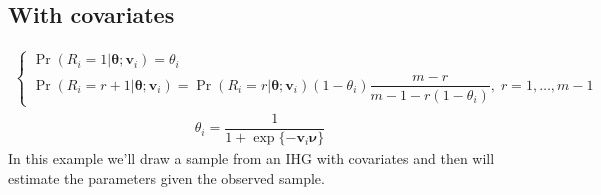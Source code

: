 \documentclass[letterpaper,10pt,english]{sphinxmanual}
\begin{document}
\subsection{With covariates}
\label{\detokenize{manual:ihg-with-covariates}}\label{\detokenize{manual:id237}}
\sphinxAtStartPar
{}
\begin{equation*}
\begin{split}\left\{
\begin{array}{l}
    \Pr(R_i=1|\pmb\theta;\pmb v_i) = \theta_i
    \\
    \Pr(R_i=r+1|\pmb\theta;\pmb v_i) = \Pr(R_i=r|\pmb\theta;\pmb v_i)(1-\theta_i)\dfrac{m-r}{m-1-r(1-\theta_i)},\; r= 1, \ldots, m-1
\end{array}
\right.\end{split}
\end{equation*}\begin{equation*}
\begin{split}\theta_i = \dfrac{1}{1 + \exp\{ - \pmb v_i \pmb \nu \}}\end{split}
\end{equation*}
\sphinxAtStartPar
In this example we’ll draw a sample from an IHG with covariates
and then will estimate the parameters given the observed sample.
\def\sphinxLiteralBlockLabel{\label{\detokenize{manual:id294}}}
\end{document}
